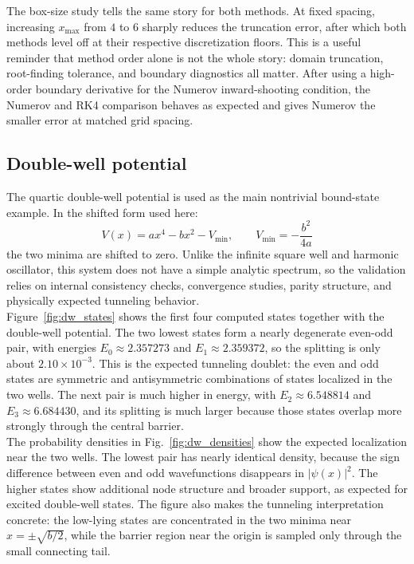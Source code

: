 \documentclass[11pt]{article}
\begin{document}
\begin{refsection}
                The box-size study tells the same story for both methods. At fixed spacing, increasing $x_{\max}$ from $4$ to $6$ sharply reduces the truncation error, after which both methods level off at their respective discretization floors. This is a useful reminder that method order alone is not the whole story: domain truncation, root-finding tolerance, and boundary diagnostics all matter. After using a high-order boundary derivative for the Numerov inward-shooting condition, the Numerov and RK4 comparison behaves as expected and gives Numerov the smaller error at matched grid spacing.

        \subsection{Double-well potential}
            The quartic double-well potential is used as the main nontrivial bound-state example. In the shifted form used here:
            \begin{equation}
            V(x)=ax^4-bx^2-V_{\min}, \qquad V_{\min}=-\frac{b^2}{4a}
            \end{equation}
            the two minima are shifted to zero. Unlike the infinite square well and harmonic oscillator, this system does not have a simple analytic spectrum, so the validation relies on internal consistency checks, convergence studies, parity structure, and physically expected tunneling behavior. \\

            Figure~\ref{fig:dw_states} shows the first four computed states together with the double-well potential. The two lowest states form a nearly degenerate even-odd pair, with energies $E_0\approx2.357273$ and $E_1\approx2.359372$, so the splitting is only about $2.10\times10^{-3}$. This is the expected tunneling doublet: the even and odd states are symmetric and antisymmetric combinations of states localized in the two wells. The next pair is much higher in energy, with $E_2\approx6.548814$ and $E_3\approx6.684430$, and its splitting is much larger because those states overlap more strongly through the central barrier. \\

            The probability densities in Fig.~\ref{fig:dw_densities} show the expected localization near the two wells. The lowest pair has nearly identical density, because the sign difference between even and odd wavefunctions disappears in $|\psi(x)|^2$. The higher states show additional node structure and broader support, as expected for excited double-well states. The figure also makes the tunneling interpretation concrete: the low-lying states are concentrated in the two minima near $x=\pm\sqrt{b/2}$, while the barrier region near the origin is sampled only through the small connecting tail. \\


\end{refsection}
\end{document}
